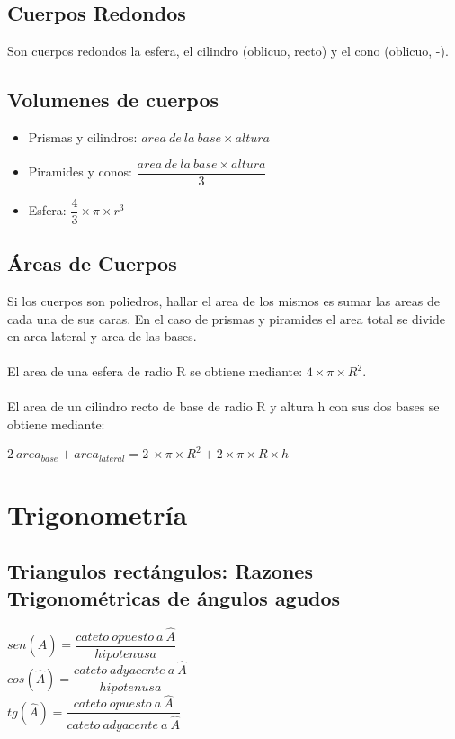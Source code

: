 \documentclass[10pt]{article}
\begin{document}
\subsection{Cuerpos Redondos}
Son cuerpos redondos la esfera, el cilindro (oblicuo, recto) y el cono (oblicuo, -).\\
\subsection{Volumenes de cuerpos}
\begin{itemize}
\item Prismas y cilindros: $area\ de\ la\ base \times altura$
\item Piramides y conos: $\dfrac{area\ de\ la\ base \times altura}{3}$
\item Esfera: $\dfrac{4}{3} \times \pi \times r^{3}$
\end{itemize}
\subsection{Áreas de Cuerpos}
Si los cuerpos son poliedros, hallar el area de los mismos es sumar las areas de cada una de sus caras. En el caso de prismas y piramides el area total se divide en area lateral y area de las bases.\\ \\
El area de una esfera de radio R se obtiene mediante: $4 \times \pi \times R^2$.\\ \\
El area de un cilindro recto de base de radio R y altura h con sus dos bases se obtiene mediante:
\begin{center}
$2\ area_{base} + area_{lateral} = 2\ \times \pi \times R^2 + 2 \times \pi \times R \times h$
\end{center}

\newpage
\section{Trigonometría}
\subsection{Triangulos rectángulos: Razones Trigonométricas de ángulos agudos}
\begin{multicols}{3}
$sen(\hat{A}) = \dfrac{cateto\ opuesto\ a \ \hat{A}}{hipotenusa}$\\
$cos(\hat{A}) = \dfrac{cateto\ adyacente\ a \ \hat{A}}{hipotenusa}$\\
$tg(\hat{A}) = \dfrac{cateto\ opuesto\ a \ \hat{A}}{cateto\ adyacente\ a \ \hat{A}}$
\end{multicols}
\end{document}

